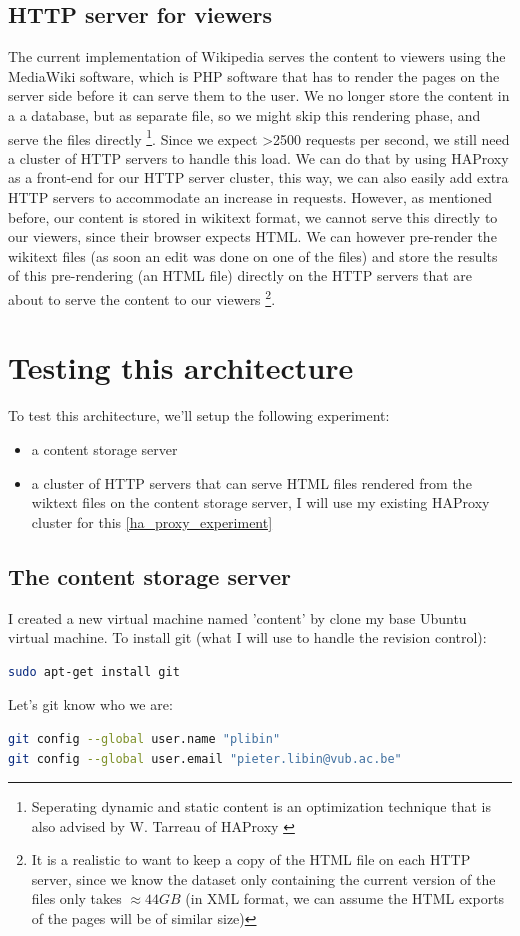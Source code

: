 \documentclass[12pt]{report}
\begin{document}
\subsection{HTTP server for viewers}
The current implementation of Wikipedia serves the content to viewers
using the MediaWiki software, which is PHP software that has to render
the pages on the server side before it can serve them to the user.
We no longer store the content in a a database, but as separate file, so
we might skip this rendering phase, and serve the files directly
\footnote{Seperating dynamic and static content is an optimization
  technique that is also advised by W. Tarreau of HAProxy \cite{haproxy:2013}}. 
Since we expect >2500 requests per second, we still need a cluster of
HTTP servers to handle this load. We can do that by using HAProxy as a 
front-end for our HTTP server cluster, this way, we can also easily add
extra HTTP servers to accommodate an increase in requests.
However, as mentioned before, our content is stored in wikitext
format, we cannot serve this directly to our viewers, since their
browser expects HTML. We can however pre-render the wikitext files (as
soon an edit was done on one of the files) and store the results of
this pre-rendering (an HTML file) directly on the HTTP servers that
are about to serve the content to our viewers \footnote{It is a
  realistic to want to keep a copy of the HTML file on each HTTP server,
since we know the dataset only containing the current version of
the files only takes $\approx 44GB$ (in XML format, we can assume the
HTML exports of the pages will be of similar size)}.

\section{Testing this architecture}
To test this architecture, we'll setup the following experiment:
\begin{itemize}
\item a content storage server 
\item a cluster of HTTP servers that can serve HTML files rendered from
the wiktext files on the content storage server, I will use my
existing HAProxy cluster for this \ref{ha_proxy_experiment}
\end{itemize}

\subsection{The content storage server}
I created a new virtual machine named 'content' by clone my base
Ubuntu virtual machine.
To install git (what I will use to handle the revision control):
\begin{lstlisting}[language=bash]
sudo apt-get install git
\end{lstlisting}
Let's git know who we are:
\begin{lstlisting}[language=bash]
git config --global user.name "plibin"
git config --global user.email "pieter.libin@vub.ac.be"
\end{lstlisting}
\end{document}
